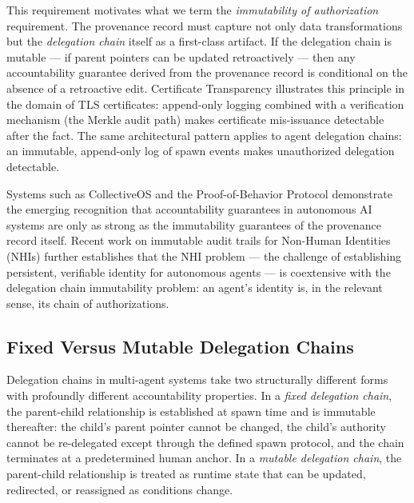 This requirement motivates what we term the \emph{immutability of authorization} requirement. The provenance record must capture not only data transformations but the \emph{delegation chain} itself as a first-class artifact. If the delegation chain is mutable --- if parent pointers can be updated retroactively --- then any accountability guarantee derived from the provenance record is conditional on the absence of a retroactive edit. Certificate Transparency \cite{laurie2013certificate} illustrates this principle in the domain of TLS certificates: append-only logging combined with a verification mechanism (the Merkle audit path) makes certificate mis-issuance detectable after the fact. The same architectural pattern applies to agent delegation chains: an immutable, append-only log of spawn events makes unauthorized delegation detectable.

Systems such as CollectiveOS \cite{collectiveos} and the Proof-of-Behavior Protocol \cite{pob-draft} demonstrate the emerging recognition that accountability guarantees in autonomous AI systems are only as strong as the immutability guarantees of the provenance record itself. Recent work on immutable audit trails for Non-Human Identities (NHIs) \cite{nhi-lineage} further establishes that the NHI problem --- the challenge of establishing persistent, verifiable identity for autonomous agents --- is coextensive with the delegation chain immutability problem: an agent's identity is, in the relevant sense, its chain of authorizations.

\subsection{Fixed Versus Mutable Delegation Chains}

Delegation chains in multi-agent systems take two structurally different forms with profoundly different accountability properties. In a \emph{fixed delegation chain}, the parent-child relationship is established at spawn time and is immutable thereafter: the child's parent pointer cannot be changed, the child's authority cannot be re-delegated except through the defined spawn protocol, and the chain terminates at a predetermined human anchor. In a \emph{mutable delegation chain}, the parent-child relationship is treated as runtime state that can be updated, redirected, or reassigned as conditions change.

